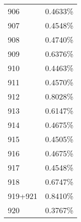 \documentclass[
]{book}
\begin{document}
\begin{longtable}[]{@{}ll@{}}
906 & 0.4633\% \\
907 & 0.4548\% \\
908 & 0.4740\% \\
909 & 0.6376\% \\
910 & 0.4463\% \\
911 & 0.4570\% \\
912 & 0.8028\% \\
913 & 0.6147\% \\
914 & 0.4675\% \\
915 & 0.4505\% \\
916 & 0.4675\% \\
917 & 0.4548\% \\
918 & 0.6747\% \\
919+921 & 0.8410\% \\
920 & 0.3767\% \\
\bottomrule
\end{longtable}

  
\end{document}
